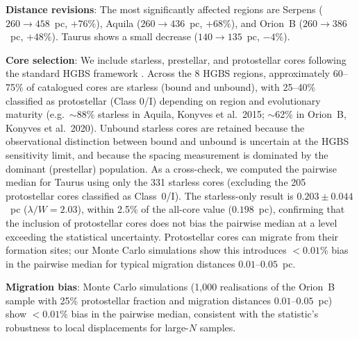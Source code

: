 \documentclass[twoside,twocolumn]{mnras}
\begin{document}
\textbf{Distance revisions}: The most significantly affected regions are Serpens
($260 \to 458$~pc, $+76\%$), Aquila ($260 \to 436$~pc, $+68\%$), and Orion~B
($260 \to 386$~pc, $+48\%$). Taurus shows a small decrease ($140 \to 135$~pc, $-4\%$).

\textbf{Core selection}: We include starless, prestellar, and protostellar cores
following the standard HGBS framework \citep{Konyves2015, Konyves2020}. Across the
8 HGBS regions, approximately 60--75\% of catalogued cores are starless (bound and
unbound), with 25--40\% classified as protostellar (Class 0/I) depending on region
and evolutionary maturity (e.g.\ $\sim$88\% starless in Aquila, Konyves et al.\ 2015;
$\sim$62\% in Orion~B, Konyves et al.\ 2020). Unbound starless cores are retained
because the observational distinction between bound and unbound is uncertain at the
HGBS sensitivity limit, and because the spacing measurement is dominated by the
dominant (prestellar) population. As a cross-check, we computed the pairwise median for Taurus using only the 331 starless cores (excluding the 205 protostellar cores classified as Class~0/I). The starless-only result is $0.203 \pm 0.044$~pc ($\lambda/W = 2.03$), within 2.5\% of the all-core value ($0.198$~pc), confirming that the inclusion of protostellar cores does not bias the pairwise median at a level exceeding the statistical uncertainty.
Protostellar cores can migrate from their formation
sites; our Monte Carlo simulations show this introduces $<0.01\%$ bias in the pairwise
median for typical migration distances $0.01$--$0.05$~pc.

\textbf{Migration bias}: Monte Carlo simulations (1,000 realisations of the Orion~B sample
with 25\% protostellar fraction and migration distances $0.01$--$0.05$~pc) show $<0.01\%$
bias in the pairwise median, consistent with the statistic's robustness to local
displacements for large-$N$ samples.
\end{document}
